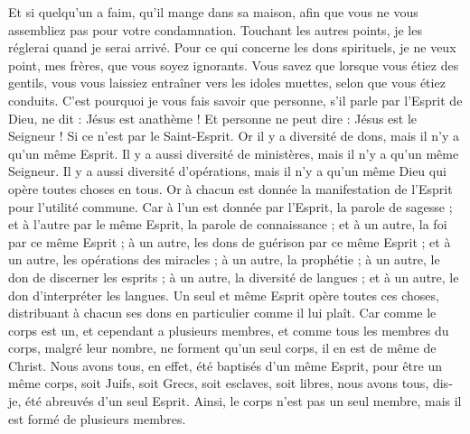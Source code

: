\begin{multicols}{2}
Et si quelqu'un a faim, qu'il mange dans sa maison, afin que vous ne vous assembliez pas pour votre condamnation.  Touchant les autres points, je les réglerai quand je serai arrivé.
\VerseOne{}Pour ce qui concerne les dons spirituels, je ne veux point, mes frères, que vous soyez ignorants.
Vous savez que lorsque vous étiez des gentils, vous vous laissiez entraîner vers les idoles muettes, selon que vous étiez conduits.
C'est pourquoi je vous fais savoir que personne, s’il parle par l'Esprit de Dieu, ne dit : Jésus est anathème ! Et personne ne peut dire : Jésus est le Seigneur ! Si ce n’est par le Saint-Esprit.
 Or il y a diversité de dons, mais il n'y a qu'un même Esprit.
Il y a aussi diversité de ministères, mais il n'y a qu'un même Seigneur.
Il y a aussi diversité d'opérations, mais il n'y a qu'un même Dieu qui opère toutes choses en tous.
Or à chacun est donnée la manifestation de l'Esprit pour l'utilité commune.
Car à l'un est donnée par l'Esprit, la parole de sagesse ; et à l'autre par le même Esprit, la parole de connaissance ;
et à un autre, la foi par ce même Esprit ; à un autre, les dons de guérison par ce même Esprit ;
et à un autre, les opérations des miracles ; à un autre, la prophétie ; à un autre, le don de discerner les esprits ; à un autre, la diversité de langues ; et à un autre, le don d'interpréter les langues.
Un seul et même Esprit opère toutes ces choses, distribuant à chacun ses dons en particulier comme il lui plaît.
Car comme le corps est un, et cependant a plusieurs membres, et comme tous les membres du corps, malgré leur nombre, ne forment qu’un seul corps, il en est de même de Christ.
Nous avons tous, en effet, été baptisés d'un même Esprit, pour être un même corps, soit Juifs, soit Grecs, soit esclaves, soit libres, nous avons tous, dis-je, été abreuvés d'un seul Esprit.
Ainsi, le corps n’est pas un seul membre, mais il est formé de plusieurs membres.

\end{multicols}
